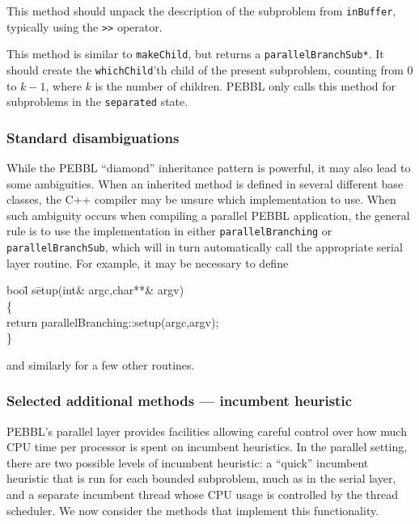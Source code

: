 This method should unpack the description of the subproblem from
\texttt{inBuffer}, typically using the \texttt{>>} operator.

This method is similar to \texttt{makeChild}, but returns a
\texttt{parallelBranchSub*}.  It should create the
\texttt{whichChild}'th child of the present subproblem, counting from
$0$ to $k-1$, where $k$ is the number of children.  PEBBL only calls
this method for subproblems in the \texttt{separated} state.


\subsubsection{Standard disambiguations}
While the PEBBL ``diamond'' inheritance pattern is powerful, it may also lead
to some ambiguities.  When an inherited method is defined in several
different base classes, the C++ compiler may be unsure which
implementation to use.  When such ambiguity occurs when compiling a
parallel PEBBL application, the general rule is to use the
implementation in either \texttt{parallelBranching} or
\texttt{parallelBranchSub}, which will in turn automatically call the
appropriate serial layer routine.  For example, it may be necessary to
define
\begin{codeblock}
boo\=l s\=etup(int\& argc,char**\& argv) \\
\>    \{  \\
\>\>      return parallelBranching::setup(argc,argv); \\
 \>   \}
\end{codeblock}
and similarly for a few other routines.


\subsubsection{Selected additional methods --- incumbent heuristic}
PEBBL's parallel layer provides facilities allowing careful control
over how much CPU time per processor is spent on incumbent
heuristics.  In the parallel setting, there are two possible levels of
incumbent heuristic: a ``quick'' incumbent heuristic that is run for
each bounded subproblem, much as in the serial layer, and a separate
incumbent thread whose CPU usage is controlled by the thread
scheduler.  We now consider the methods that implement this
functionality.

